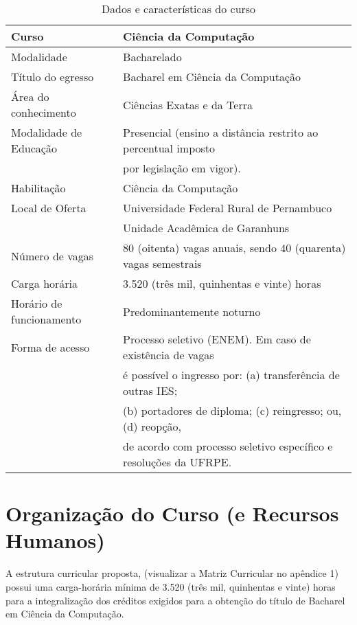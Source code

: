 \documentclass[
	12pt,				%
	openright,			%
  oneside,     %
	a4paper,			%
	english,			%
	french,				%
	spanish,			%
	brazil				%
	]{abntex2}
\begin{document}
\begin{small}
\begin{longtable}{ll}
 \caption{Dados e características do curso}
 \label{ltab:DadosCaracteristicas1}
\\
\hline
Curso & Ciência da Computação \\ 
\hline
Modalidade & Bacharelado \\ 
Título do egresso & Bacharel em Ciência da Computação \\ 
Área do conhecimento & Ciências Exatas e da Terra \\ 
Modalidade de Educação & Presencial (ensino a distância restrito ao percentual imposto \\ 
 & por legislação em vigor). \\ 
Habilitação & Ciência da Computação \\ 
Local de Oferta & Universidade Federal Rural de Pernambuco \\ 
 & Unidade Acadêmica de Garanhuns \\ 
Número de vagas & 80 (oitenta) vagas anuais, sendo 40 (quarenta) vagas semestrais \\ 
Carga horária & 3.520 (três mil, quinhentas e vinte) horas \\ 
Horário de funcionamento & Predominantemente noturno \\ 
Forma de acesso & Processo seletivo (ENEM). Em caso de existência de vagas\\
 & é possível o ingresso por: (a) transferência de outras IES;\\
 & (b) portadores de diploma; (c) reingresso; ou, (d) reopção,\\
 & de acordo com  processo seletivo específico e resoluções da UFRPE. \\
\hline
\end{longtable}
\end{small}



%
%

\chapter{Organização do Curso (e Recursos Humanos)}

A estrutura curricular proposta, (visualizar a Matriz Curricular no apêndice 1) possui uma carga-horária mínima de 3.520 (três mil, quinhentas e vinte) horas para a integralização dos créditos exigidos para a obtenção do título de Bacharel em Ciência da Computação.
\end{document}
